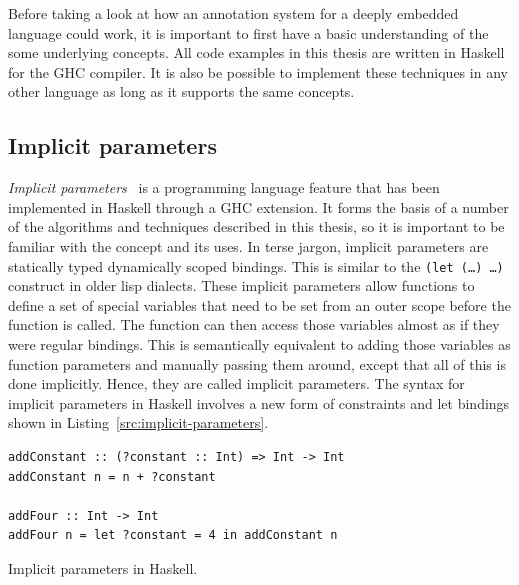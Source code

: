 \documentclass[fontsize=11pt,a4paper,parskip=half,numbers=noenddot]{scrartcl}
\begin{document}

Before taking a look at how an annotation system for a deeply embedded language
could work, it is important to first have a basic understanding of the some
underlying concepts. All code examples in this thesis are written in Haskell for
the GHC compiler. It is also be possible to implement these techniques in any
other language as long as it supports the same concepts.

\subsection{Implicit parameters}\label{sec:implicit-parameters}


\emph{Implicit parameters}~\cite{lewis2000implicit} is a programming language
feature that has been implemented in Haskell through a GHC extension. It forms
the basis of a number of the algorithms and techniques described in this thesis,
so it is important to be familiar with the concept and its uses. In terse
jargon, implicit parameters are statically typed dynamically scoped bindings.
This is similar to the \texttt{(let (\dots) \dots)} construct in older lisp
dialects. These implicit parameters allow functions to define a set of special
variables that need to be set from an outer scope before the function is called.
The function can then access those variables almost as if they were regular
bindings. This is semantically equivalent to adding those variables as function
parameters and manually passing them around, except that all of this is done
implicitly. Hence, they are called implicit parameters. The syntax for implicit
parameters in Haskell involves a new form of constraints and let bindings shown
in Listing~\ref{src:implicit-parameters}.

\begin{listing}[!ht]
\begin{verbatim}
addConstant :: (?constant :: Int) => Int -> Int
addConstant n = n + ?constant

addFour :: Int -> Int
addFour n = let ?constant = 4 in addConstant n
\end{verbatim}
\caption{Implicit parameters in Haskell.}\label{src:implicit-parameters}
\end{listing}
\end{document}
